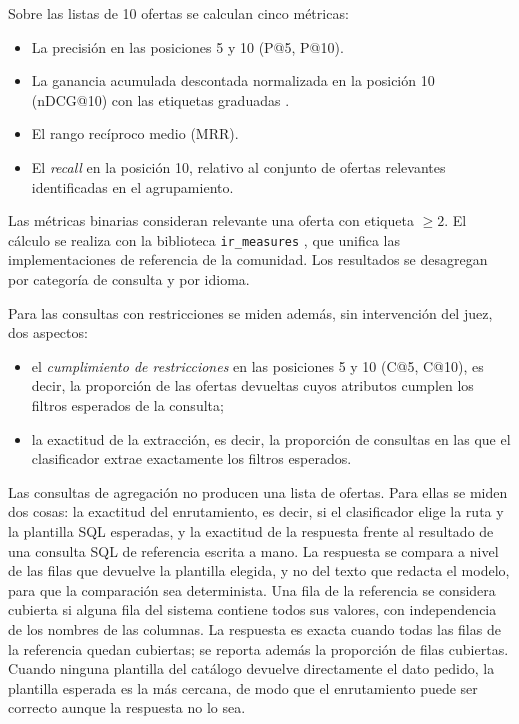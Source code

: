 Sobre las listas de 10 ofertas se calculan cinco métricas:
\begin{itemize}
    \item La precisión en las posiciones 5 y 10 (P@5, P@10).
    \item La ganancia acumulada descontada normalizada en la posición 10 (nDCG@10) con las etiquetas graduadas \citep{Jarvelin2002}.
    \item El rango recíproco medio (MRR).
    \item El \textit{recall} en la posición 10, relativo al conjunto de ofertas relevantes identificadas en el agrupamiento.
\end{itemize}
Las métricas binarias consideran relevante una oferta con etiqueta $\geq 2$. El cálculo se realiza con la biblioteca \texttt{ir\_measures} \citep{MacAvaney2022}, que unifica las implementaciones de referencia de la comunidad. Los resultados se desagregan por categoría de consulta y por idioma.

Para las consultas con restricciones se miden además, sin intervención del juez, dos aspectos:
\begin{itemize}
    \item el \emph{cumplimiento de restricciones} en las posiciones 5 y 10 (C@5, C@10), es decir, la proporción de las ofertas devueltas cuyos atributos cumplen los filtros esperados de la consulta;
    \item la exactitud de la extracción, es decir, la proporción de consultas en las que el clasificador extrae exactamente los filtros esperados.
\end{itemize}

Las consultas de agregación no producen una lista de ofertas. Para ellas se miden dos cosas: la exactitud del enrutamiento, es decir, si el clasificador elige la ruta y la plantilla SQL esperadas, y la exactitud de la respuesta frente al resultado de una consulta SQL de referencia escrita a mano. La respuesta se compara a nivel de las filas que devuelve la plantilla elegida, y no del texto que redacta el modelo, para que la comparación sea determinista. Una fila de la referencia se considera cubierta si alguna fila del sistema contiene todos sus valores, con independencia de los nombres de las columnas. La respuesta es exacta cuando todas las filas de la referencia quedan cubiertas; se reporta además la proporción de filas cubiertas. Cuando ninguna plantilla del catálogo devuelve directamente el dato pedido, la plantilla esperada es la más cercana, de modo que el enrutamiento puede ser correcto aunque la respuesta no lo sea.

